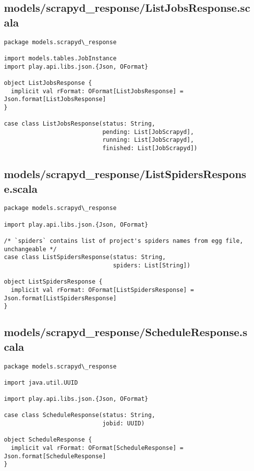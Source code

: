 \subsection{models/scrapyd\_response/ListJobsResponse.scala}
\begin{lstlisting}
package models.scrapyd\_response

import models.tables.JobInstance
import play.api.libs.json.{Json, OFormat}

object ListJobsResponse {
  implicit val rFormat: OFormat[ListJobsResponse] = Json.format[ListJobsResponse]
}

case class ListJobsResponse(status: String,
                            pending: List[JobScrapyd],
                            running: List[JobScrapyd],
                            finished: List[JobScrapyd])

\end{lstlisting}
\subsection{models/scrapyd\_response/ListSpidersResponse.scala}
\begin{lstlisting}
package models.scrapyd\_response

import play.api.libs.json.{Json, OFormat}

/* `spiders` contains list of project's spiders names from egg file, unchangeable */
case class ListSpidersResponse(status: String,
                               spiders: List[String])

object ListSpidersResponse {
  implicit val rFormat: OFormat[ListSpidersResponse] = Json.format[ListSpidersResponse]
}
\end{lstlisting}
\subsection{models/scrapyd\_response/ScheduleResponse.scala}
\begin{lstlisting}
package models.scrapyd\_response

import java.util.UUID

import play.api.libs.json.{Json, OFormat}

case class ScheduleResponse(status: String,
                            jobid: UUID)

object ScheduleResponse {
  implicit val rFormat: OFormat[ScheduleResponse] = Json.format[ScheduleResponse]
}
\end{lstlisting}
